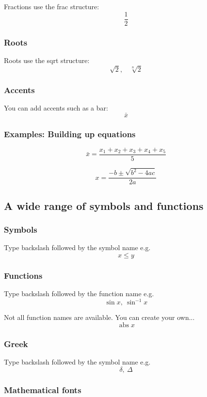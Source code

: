 \documentclass[a4paper,12pt]{extarticle}
\newcommand{\abs}{\operatorname{abs}}
\begin{document}
Fractions use the frac structure:
\[\frac{1}{2}\]

\subsubsection{Roots}

Roots use the sqrt structure:
\[
\sqrt{2}, \quad \sqrt[n]{2}
\]

\subsubsection{Accents}

You can add accents such as a bar:
\[\bar{x}\]

\subsubsection{Examples: Building up equations}

\[
\bar{x}=\frac{x_1+x_2+x_3+x_4+x_5}{5}
\]

\[
x = \frac{-b\pm \sqrt{b^2-4ac}}{2a}
\]

\subsection{A wide range of symbols and functions}

\subsubsection{Symbols}

Type backslash followed by the symbol name e.g.
\[
x \leq y
\]

\subsubsection{Functions}

Type backslash followed by the function name e.g.
\[
\sin x, \ \sin^{-1} x
\]

Not all function names are available. You can create your own...
\[
\abs x
\]

\subsubsection{Greek}

Type backslash followed by the symbol name e.g. 
\[
\delta,\ \Delta
\]

\subsubsection{Mathematical fonts}
\end{document}
